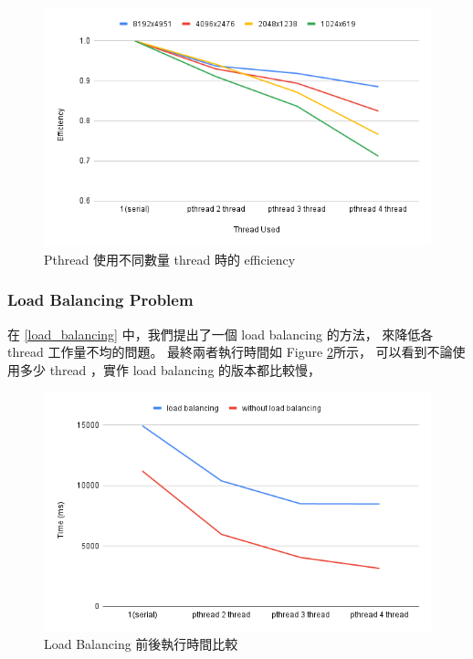 \documentclass[sigconf,nonacm]{acmart}
\begin{document}
\begin{figure}[htbp]
  \centering
  \includegraphics[width=\linewidth]{"./image/pthread_efficiency.png"}
  \caption{Pthread 使用不同數量 thread 時的 efficiency}
  \label{fig:pthread_efficiency}
\end{figure}

\subsubsection{Load Balancing Problem}

在 \ref{load_balancing} 中，我們提出了一個 load balancing 的方法，
來降低各 thread 工作量不均的問題。
最終兩者執行時間如 Figure \ref{fig:pthread_load_balancing}所示，
可以看到不論使用多少 thread ，實作 load balancing 的版本都比較慢，

\begin{figure}[htbp]
  \centering
  \includegraphics[width=\linewidth]{"./image/pthread_load_balance.png"}
  \caption{Load Balancing 前後執行時間比較}
  \label{fig:pthread_load_balancing}
\end{figure}
\end{document}
